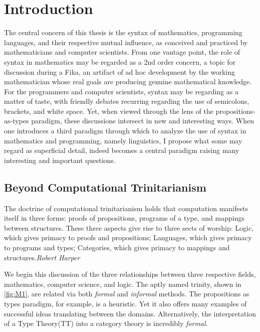 \section{Introduction}
\label{sec:intro}

The central concern of this thesis is the syntax of mathematics, programming
languages, and their respective mutual influence, as conceived and practiced by
mathematicians and computer scientists.  From one vantage point, the role of
syntax in mathematics may be regarded as a 2nd order concern, a topic for
discussion during a Fika, an artifact of ad hoc development by the working
mathematician whose real goals are producing genuine mathematical knowledge.
For the programmers and computer scientists, syntax may be regarding as a
matter of taste, with friendly debates recurring regarding the use of
semicolons, brackets, and white space.  Yet, when viewed through the lens of
the propositions-as-types paradigm, these discussions intersect in new and
interesting ways.  When one introduces a third paradigm through which to
analyze the use of syntax in mathematics and programming, namely linguistics, I
propose what some may regard as superficial detail, indeed becomes a central
paradigm raising many interesting and important questions. 


\subsection{Beyond Computational Trinitarianism}

\begin{displayquote}

The doctrine of computational trinitarianism holds that computation manifests
itself in three forms: proofs of propositions, programs of a type, and mappings
between structures. These three aspects give rise to three sects of worship:
Logic, which gives primacy to proofs and propositions; Languages, which gives
primacy to programs and types; Categories, which gives primacy to mappings and
structures.\emph{Robert Harper} \cite{harperTrinity}
\end{displayquote}

We begin this discussion of the three relationships between three respective
fields, mathematics, computer science, and logic. The aptly named 
trinity, shown in \autoref{fig:M1}, are related via both \emph{formal} and \emph{informal}
methods. The propositions as types paradigm, for example, is a heuristic. Yet
it also offers many examples of successful ideas translating between the domains.
Alternatively, the interpretation of a Type Theory(TT) into a category theory is
incredibly \emph{formal}.



